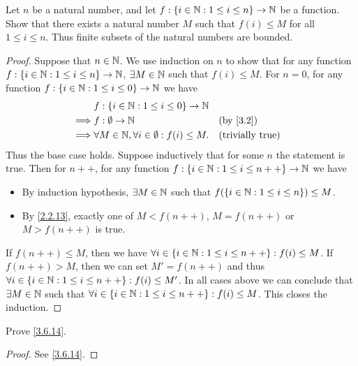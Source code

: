 \begin{ex}\label{ex:3.6.3}
	Let \(n\) be a natural number, and let \(f : \left\lbrace i \in \mathbb{N} : 1 \leq i \leq n\right\rbrace \to \mathbb{N}\) be a function.
	Show that there exists a natural number \(M\) such that \(f(i) \leq M\) for all \(1 \leq i \leq n\).
	Thus finite subsets of the natural numbers are bounded.
\end{ex}

\begin{proof}
	Suppose that \(n \in \mathbb{N}\).
	We use induction on \(n\) to show that for any function \(f : \left\lbrace i \in \mathbb{N} : 1 \leq i \leq n\right\rbrace \to \mathbb{N}\), \(\exists M \in \mathbb{N}\) such that \(f(i) \leq M\).
	For \(n = 0\), for any function \(f : \left\lbrace i \in \mathbb{N} : 1 \leq i \leq 0\right\rbrace \to \mathbb{N}\) we have
	\begin{align*}
		         & f : \set{i \in \N : 1 \leq i \leq 0} \to \N                                           \\
		\implies & f : \emptyset \to \N                                     &  & \by{3.2}                \\
		\implies & \forall M \in \N, \forall i \in \emptyset : f(i) \leq M. &  & \text{(trivially true)} \\
	\end{align*}
	Thus the base case holds.
	Suppose inductively that for some \(n\) the statement is true.
	Then for \(n++\), for any function \(f : \left\lbrace i \in \mathbb{N} : 1 \leq i \leq n++\right\rbrace \to \mathbb{N}\) we have
	\begin{itemize}
		\item By induction hypothesis, \(\exists M \in \mathbb{N}\) such that \(f(\left\lbrace i \in \mathbb{N} : 1 \leq i \leq n\right\rbrace) \leq M\).
		\item By \cref{2.2.13}, exactly one of \(M < f(n++)\), \(M = f(n++)\) or \(M > f(n++)\) is true.
	\end{itemize}
	If \(f(n++) \leq M\), then we have \(\forall i \in \left\lbrace i \in \mathbb{N} : 1 \leq i \leq n++\right\rbrace : f(i) \leq M\).
	If \(f(n++) > M\), then we can set \(M' = f(n++)\) and thus \(\forall i \in \left\lbrace i \in \mathbb{N} : 1 \leq i \leq n++\right\rbrace : f(i) \leq M'\).
	In all cases above we can conclude that \(\exists M \in \mathbb{N}\) such that \(\forall i \in \left\lbrace i \in \mathbb{N} : 1 \leq i \leq n++\right\rbrace : f(i) \leq M\).
	This closes the induction.
\end{proof}

\begin{ex}\label{ex:3.6.4}
	Prove \cref{3.6.14}.
\end{ex}

\begin{proof}
	See \cref{3.6.14}.
\end{proof}

